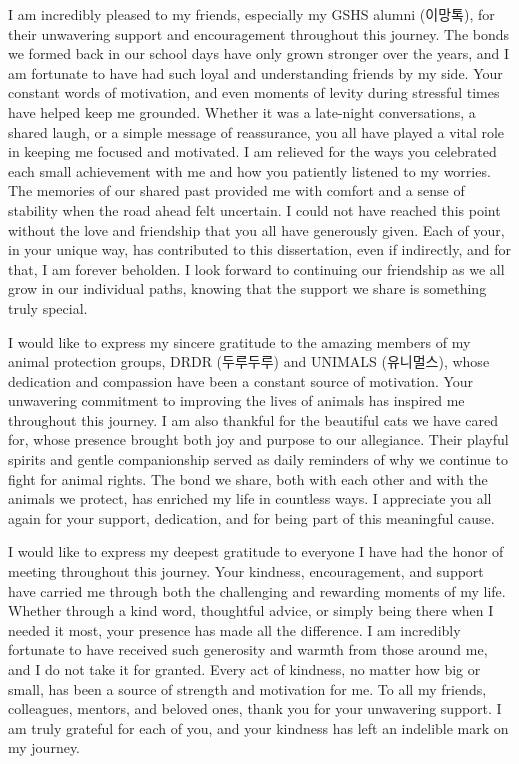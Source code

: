 \documentclass[11pt, a4paper, onecolumn, oneside]{report}
\begin{document}
        I am incredibly pleased to my friends, especially my GSHS alumni (이망톡), for their unwavering support and encouragement throughout this journey. The bonds we formed back in our school days have only grown stronger over the years, and I am fortunate to have had such loyal and understanding friends by my side. Your constant words of motivation, and even moments of levity during stressful times have helped keep me grounded. Whether it was a late-night conversations, a shared laugh, or a simple message of reassurance, you all have played a vital role in keeping me focused and motivated. I am relieved for the ways you celebrated each small achievement with me and how you patiently listened to my worries. The memories of our shared past provided me with comfort and a sense of stability when the road ahead felt uncertain. I could not have reached this point without the love and friendship that you all have generously given. Each of your, in your unique way, has contributed to this dissertation, even if indirectly, and for that, I am forever beholden. I look forward to continuing our friendship as we all grow in our individual paths, knowing that the support we share is something truly special.

        I would like to express my sincere gratitude to the amazing members of my animal protection groups, DRDR (두루두루) and UNIMALS (유니멀스), whose dedication and compassion have been a constant source of motivation. Your unwavering commitment to improving the lives of animals has inspired me throughout this journey. I am also thankful for the beautiful cats we have cared for, whose presence brought both joy and purpose to our allegiance. Their playful spirits and gentle companionship served as daily reminders of why we continue to fight for animal rights. The bond we share, both with each other and with the animals we protect, has enriched my life in countless ways. I appreciate you all again for your support, dedication, and for being part of this meaningful cause.

        I would like to express my deepest gratitude to everyone I have had the honor of meeting throughout this journey. Your kindness, encouragement, and support have carried me through both the challenging and rewarding moments of my life. Whether through a kind word, thoughtful advice, or simply being there when I needed it most, your presence has made all the difference. I am incredibly fortunate to have received such generosity and warmth from those around me, and I do not take it for granted. Every act of kindness, no matter how big or small, has been a source of strength and motivation for me. To all my friends, colleagues, mentors, and beloved ones, thank you for your unwavering support. I am truly grateful for each of you, and your kindness has left an indelible mark on my journey.
\end{document}
